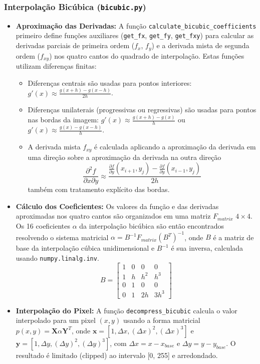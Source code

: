 \documentclass[12pt, a4paper]{article}
\begin{document}
\subsubsection{Interpolação Bicúbica (\texttt{bicubic.py})}
\begin{itemize}
    \item \textbf{Aproximação das Derivadas:} A função \texttt{calculate\_bicubic\_coefficients} primeiro define funções auxiliares (\texttt{get\_fx}, \texttt{get\_fy}, \texttt{get\_fxy}) para calcular as derivadas parciais de primeira ordem ($f_x$, $f_y$) e a derivada mista de segunda ordem ($f_{xy}$) nos quatro cantos do quadrado de interpolação. Estas funções utilizam diferenças finitas:
        \begin{itemize}
            \item Diferenças centrais são usadas para pontos interiores: $g'(x) \approx \frac{g(x+h) - g(x-h)}{2h}$.
            \item Diferenças unilaterais (progressivas ou regressivas) são usadas para pontos nas bordas da imagem: $g'(x) \approx \frac{g(x+h) - g(x)}{h}$ ou $g'(x) \approx \frac{g(x) - g(x-h)}{h}$.
            \item A derivada mista $f_{xy}$ é calculada aplicando a aproximação da derivada em uma direção sobre a aproximação da derivada na outra direção $$\frac{\partial^2 f}{\partial x \partial y} \approx \frac{\frac{\partial f}{\partial y}(x_{i+1},y_j) - \frac{\partial f}{\partial y}(x_{i-1},y_j)}{2h}$$ também com tratamento explícito das bordas.
        \end{itemize}
    \item \textbf{Cálculo dos Coeficientes:} Os valores da função e das derivadas aproximadas nos quatro cantos são organizados em uma matriz $F_{matrix}$ $4 \times 4$. Os 16 coeficientes $\alpha$ da interpolação bicúbica são então encontrados resolvendo o sistema matricial $\alpha = B^{-1} F_{matrix} (B^T)^{-1}$, onde $B$ é a matriz de base da interpolação cúbica unidimensional e $B^{-1}$ é sua inversa, calculada usando \texttt{numpy.linalg.inv}. $$ B = \begin{bmatrix} 1 & 0 & 0 & 0 \\ 1 & h & h^2 & h^3 \\ 0 & 1 & 0 & 0 \\ 0 & 1 & 2h & 3h^3 \end{bmatrix} $$
    \item \textbf{Interpolação do Pixel:} A função \texttt{decompress\_bicubic} calcula o valor interpolado para um pixel $(x, y)$ usando a forma matricial $p(x,y) = \mathbf{X} \alpha \mathbf{Y}^T$, onde $\mathbf{x} = [1, \Delta x, (\Delta x)^2, (\Delta x)^3]$ e $\mathbf{y} = [1, \Delta y, (\Delta y)^2, (\Delta y)^3]$, com $\Delta x = x - x_{base}$ e $\Delta y = y - y_{base}$. O resultado é limitado (clipped) ao intervalo [0, 255] e arredondado.
\end{itemize}
\end{document}
